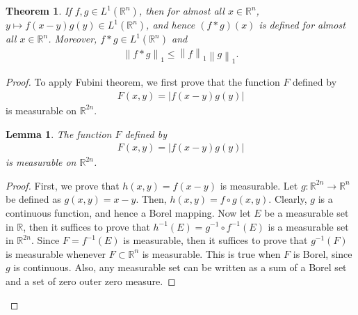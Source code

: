 \documentclass[11pt]{book}
\newtheorem{theorem}{Theorem}[chapter]
\newtheorem{lemma}{Lemma}[chapter]
\theoremstyle{definition}
\numberwithin{equation}{chapter}
\begin{document}
\begin{theorem}
If $f, g \in L^1(\mathbb{R}^n)$, then for almost all $x \in \mathbb{R}^n$, $y \mapsto f(x-y)g(y) \in L^1(\mathbb{R}^n)$, and hence $(f*g)(x)$ is defined for almost all $x \in \mathbb{R}^n$. Moreover, $f*g \in L^1(\mathbb{R}^n)$ and
\begin{align*}
    \left\|f*g\right\|_1 \leq \left\|f\right\|_1 \left\|g\right\|_1.
\end{align*}
\end{theorem}
\begin{proof}
To apply Fubini theorem, we first prove that the function $F$ defined by 
\begin{align*}
    F(x,y) = \left|f(x-y)g(y)\right|
\end{align*}
is measurable on $\mathbb{R}^{2n}$.

\medskip
\begin{lemma}
The function $F$ defined by 
\begin{align*}
    F(x,y) = \left|f(x-y)g(y)\right|
\end{align*}
is measurable on $\mathbb{R}^{2n}$.
\end{lemma}
\begin{proof}
First, we prove that $h(x,y) = f(x-y)$ is measurable. Let $g: \mathbb{R}^{2n} \to \mathbb{R}^{n}$ be defined as $g(x,y) = x - y$. Then, $h(x,y) = f \circ g(x,y)$. Clearly, $g$ is a continuous function, and hence a Borel mapping. Now let $E$ be a measurable set in $\mathbb{R}$, then it suffices to prove that $h^{-1}(E) = g^{-1} \circ f^{-1}(E)$ is a measurable set in $\mathbb{R}^{2n}$. Since $F = f^{-1}(E)$ is measurable, then it suffices to prove that $g^{-1}(F)$ is measurable whenever $F \subset \mathbb{R}^n$ is measurable. This is true when $F$ is Borel, since $g$ is continuous. Also, any measurable set can be written as a sum of a Borel set and a set of zero outer zero measure. 
    

\end{proof}
\end{proof}
\end{document}
